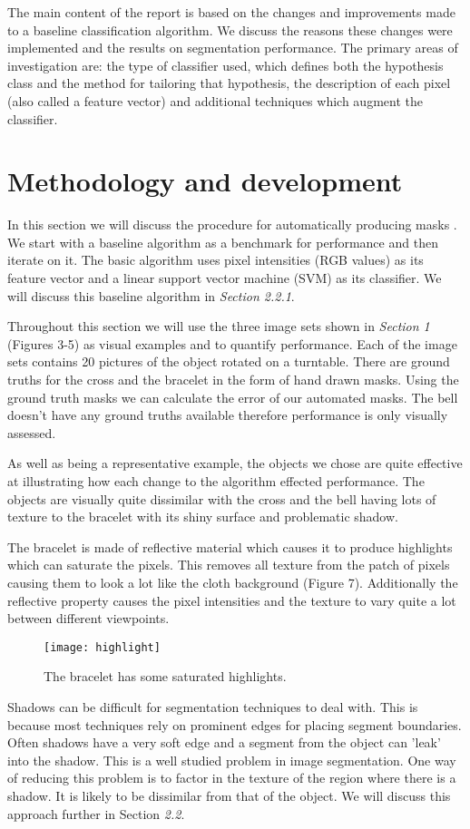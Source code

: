 \documentclass[12pt]{IIBproject}
\begin{document}
The main content of the report is based on the changes and improvements made to a baseline classification algorithm. We discuss the reasons these changes were implemented and the results on segmentation performance. The primary areas of investigation are: the type of classifier used, which defines both the hypothesis class and the method for tailoring that hypothesis, the description of each pixel (also called a feature vector) and additional techniques which augment the classifier. 

\section{Methodology and development}

 In this section we will discuss the procedure for automatically producing masks . We start with a baseline algorithm as a benchmark for performance and then iterate on it. The basic algorithm uses pixel intensities (RGB values) as its feature vector and a linear support vector machine (SVM) as its classifier. We will discuss this baseline algorithm in \emph{Section 2.2.1}.
 
 Throughout this section we will use the three image sets shown in \emph{Section 1} (Figures 3-5) as visual examples and to quantify performance.  Each of the image sets contains 20 pictures of the object rotated on a turntable. There are ground truths for the cross and the bracelet in the form of hand drawn masks. Using the ground truth masks we can calculate the error of our automated masks. The bell doesn't have any ground truths available therefore performance is only visually assessed. 

As well as being a representative example, the objects we chose are quite effective at illustrating how each change to the algorithm effected performance. The objects are visually quite dissimilar with the cross and the bell having lots of texture to the bracelet with its shiny surface and problematic shadow. 

The bracelet is made of reflective material which causes it to produce highlights which can saturate the pixels. This removes all texture from the patch of pixels causing them to look a lot like the cloth background (Figure 7). Additionally the reflective property causes the pixel intensities and the texture to vary quite a lot between different viewpoints.
\begin{figure}[H]
  \caption{The bracelet has some saturated highlights.}
  \centering
    \texttt{[image: highlight]}
\end{figure}
Shadows can be difficult for segmentation techniques to deal with. This is because most techniques rely on prominent edges for placing segment boundaries. Often shadows have a very soft edge and a segment from the object can 'leak' into the shadow. This is a well studied problem in image segmentation\cite{ecins2014shadow}. One way of reducing this problem is to factor in the texture of the region where there is a shadow. It is likely to be dissimilar from that of the object. We will discuss this approach further in Section \emph{2.2}. 
\end{document}
